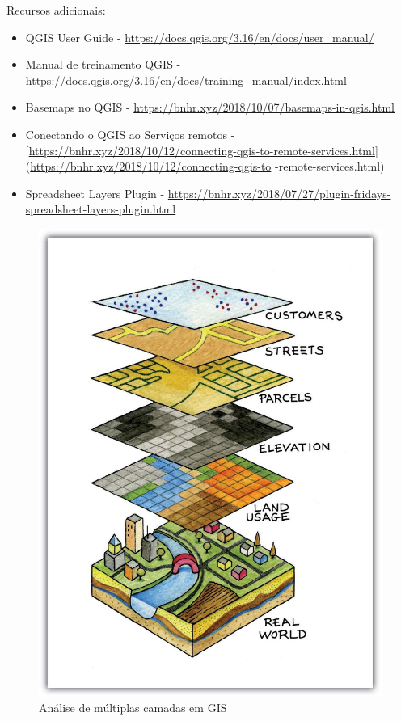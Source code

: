 \documentclass[
]{krantz}
\providecommand{\tightlist}{%
  \setlength{\itemsep}{0pt}\setlength{\parskip}{0pt}}
\begin{document}
Recursos adicionais:

\begin{itemize}
\tightlist
\item
  QGIS User Guide - \url{https://docs.qgis.org/3.16/en/docs/user_manual/}
\item
  Manual de treinamento QGIS - \url{https://docs.qgis.org/3.16/en/docs/training_manual/index.html}
\item
  Basemaps no QGIS - \url{https://bnhr.xyz/2018/10/07/basemaps-in-qgis.html}
\item
  Conectando o QGIS ao Serviços remotos - {[}\url{https://bnhr.xyz/2018/10/12/connecting-qgis-to-remote-services.html}{]} (\url{https://bnhr.xyz/2018/10/12/connecting-qgis-to} -remote-services.html)
\item
  Spreadsheet Layers Plugin - \href{https://bnhr.xyz/2018/\%2027/07\%20/\%20plugin-fridays-spreadsheet-layers-plugin.html}{https://bnhr.xyz/2018/07/27/plugin-fridays-spreadsheet-layers-plugin.html}
\end{itemize}

\begin{figure}
\centering
\includegraphics{media/modulo2/spatial-layers.jpg}
\caption{Análise de múltiplas camadas em GIS}
\end{figure}
\end{document}
